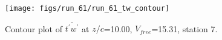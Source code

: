 \begin{figure}[H]
\centering
\texttt{[image: figs/run\_61/run\_61\_tw\_contour]}
\caption{Contour plot of $\overline{t^\prime w^\prime}$ at $z/c$=10.00, $V_{free}$=15.31, station 7.}
\end{figure}


